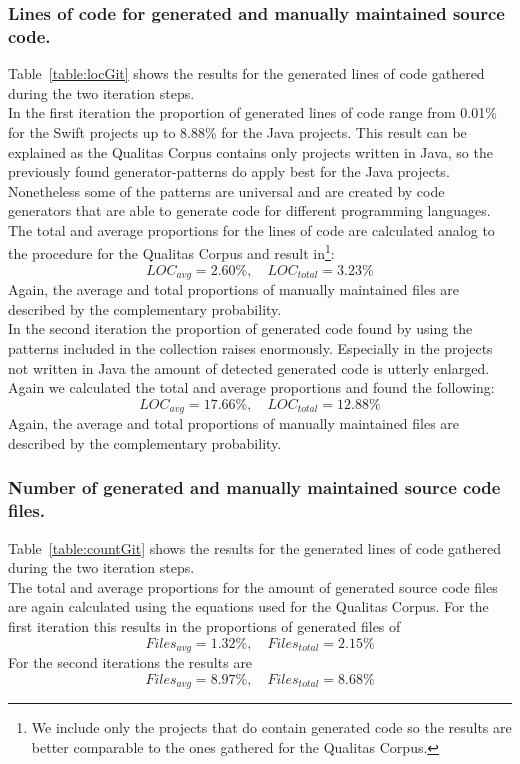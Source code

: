 \subsubsection{Lines of code for generated and manually maintained source code.}
Table~\ref{table:locGit} shows the results for the generated lines of code gathered during the two iteration steps.\\
In the first iteration the proportion of generated lines of code range from 0.01\% for the Swift projects up to 8.88\% for the Java projects. This result can be explained as the Qualitas Corpus contains only projects written in Java, so the previously found generator-patterns do apply best for the Java projects. Nonetheless some of the patterns are universal and are created by code generators that are able to generate code for different programming languages.\\
The total and average proportions for the lines of code are calculated analog to the procedure for the Qualitas Corpus and result in\footnote{
	\label{note:onlyGenerated}
	We include only the projects that do contain generated code so the results are better comparable to the ones gathered for the Qualitas Corpus.
}:
\begin{equation}
	\label{eq:locGit_1}
	LOC_{avg} = 2.60\%, \quad LOC_{total} = 3.23\%
\end{equation}
Again, the average and total proportions of manually maintained files are described by the complementary probability.\\
In the second iteration the proportion of generated code found by using the patterns included in the collection raises enormously. Especially in the projects not written in Java the amount of detected generated code is utterly enlarged.\\
Again we calculated the total and average proportions and found the following:
\begin{equation}
\label{eq:locGit_2}
LOC_{avg} = 17.66\%, \quad LOC_{total} = 12.88\%
\end{equation}
Again, the average and total proportions of manually maintained files are described by the complementary probability.

\subsubsection{Number of generated and manually maintained source code files.}
Table~\ref{table:countGit} shows the results for the generated lines of code gathered during the two iteration steps.\\
The total and average proportions for the amount of generated source code files are again calculated using the equations used for the Qualitas Corpus.
For the first iteration this results in the proportions of generated files of
\begin{equation}
\label{eq:countGit_1}
	Files_{avg} = 1.32\%, \quad Files_{total} = 2.15\%
\end{equation} 
For the second iterations the results are 
\begin{equation}
\label{eq:countGit_2}
Files_{avg} = 8.97\%, \quad Files_{total} = 8.68\%
\end{equation} 


